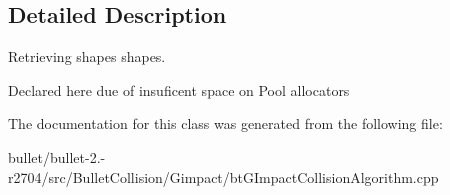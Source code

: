 \subsection{Detailed Description}
Retrieving shapes shapes. 

Declared here due of insuficent space on Pool allocators 

The documentation for this class was generated from the following file\+:\begin{DoxyCompactItemize}
\item 
bullet/bullet-\/2.-\/r2704/src/\+Bullet\+Collision/\+Gimpact/bt\+G\+Impact\+Collision\+Algorithm.\+cpp\end{DoxyCompactItemize}
